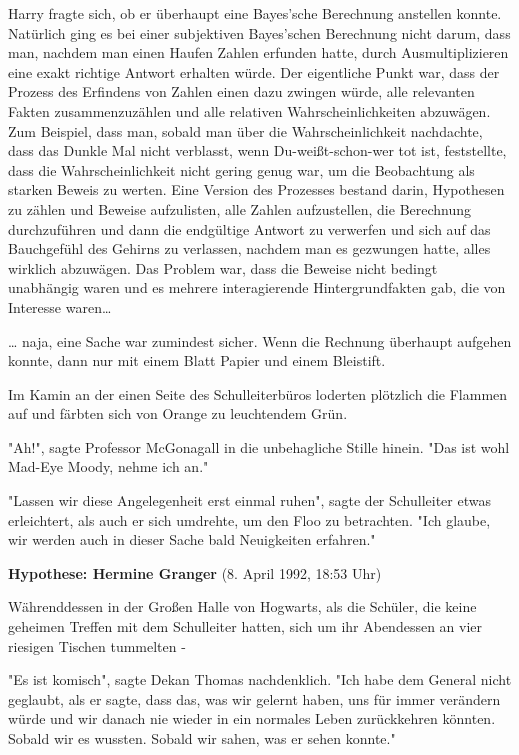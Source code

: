 {Harry fragte sich, ob er überhaupt eine Bayes'sche Berechnung anstellen konnte. Natürlich ging es bei einer subjektiven Bayes'schen Berechnung nicht darum, dass man, nachdem man einen Haufen Zahlen erfunden hatte, durch Ausmultiplizieren eine exakt richtige Antwort erhalten würde. Der eigentliche Punkt war, dass der Prozess des Erfindens von Zahlen einen dazu zwingen würde, alle relevanten Fakten zusammenzuzählen und alle relativen Wahrscheinlichkeiten abzuwägen. Zum Beispiel, dass man, sobald man über die Wahrscheinlichkeit nachdachte, dass das Dunkle Mal nicht verblasst, wenn Du-weißt-schon-wer tot ist, feststellte, dass die Wahrscheinlichkeit nicht gering genug war, um die Beobachtung als starken Beweis zu werten. Eine Version des Prozesses bestand darin, Hypothesen zu zählen und Beweise aufzulisten, alle Zahlen aufzustellen, die Berechnung durchzuführen und dann die endgültige Antwort zu verwerfen und sich auf das Bauchgefühl des Gehirns zu verlassen, nachdem man es gezwungen hatte, alles wirklich abzuwägen. Das Problem war, dass die Beweise nicht bedingt unabhängig waren und es mehrere interagierende Hintergrundfakten gab, die von Interesse waren…

… naja, eine Sache war zumindest sicher. Wenn die Rechnung überhaupt aufgehen konnte, dann nur mit einem Blatt Papier und einem Bleistift.

Im Kamin an der einen Seite des Schulleiterbüros loderten plötzlich die Flammen auf und färbten sich von Orange zu leuchtendem Grün.

"Ah!", sagte Professor McGonagall in die unbehagliche Stille hinein. "Das ist wohl Mad-Eye Moody, nehme ich an."

"Lassen wir diese Angelegenheit erst einmal ruhen", sagte der Schulleiter etwas erleichtert, als auch er sich umdrehte, um den Floo zu betrachten. "Ich glaube, wir werden auch in dieser Sache bald Neuigkeiten erfahren."

\textbf{Hypothese: Hermine Granger} (8. April 1992, 18:53 Uhr)

Währenddessen in der Großen Halle von Hogwarts, als die Schüler, die keine geheimen Treffen mit dem Schulleiter hatten, sich um ihr Abendessen an vier riesigen Tischen tummelten -

"Es ist komisch", sagte Dekan Thomas nachdenklich. "Ich habe dem General nicht geglaubt, als er sagte, dass das, was wir gelernt haben, uns für immer verändern würde und wir danach nie wieder in ein normales Leben zurückkehren könnten. Sobald wir es wussten. Sobald wir sahen, was er sehen konnte."

}
